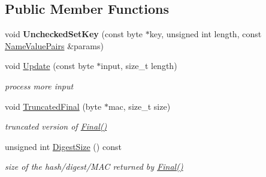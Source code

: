 \subsection*{Public Member Functions}
\begin{DoxyCompactItemize}
\item 
\hypertarget{class_d_m_a_c___base_a026cf284eb700742dc1dcb4387bd3022}{
void {\bfseries UncheckedSetKey} (const byte $\ast$key, unsigned int length, const \hyperlink{class_name_value_pairs}{NameValuePairs} \&params)}
\label{class_d_m_a_c___base_a026cf284eb700742dc1dcb4387bd3022}

\item 
\hypertarget{class_d_m_a_c___base_a2b03546cff8891451c480c18391d83a5}{
void \hyperlink{class_d_m_a_c___base_a2b03546cff8891451c480c18391d83a5}{Update} (const byte $\ast$input, size\_\-t length)}
\label{class_d_m_a_c___base_a2b03546cff8891451c480c18391d83a5}

\begin{DoxyCompactList}\small\item\em process more input \item\end{DoxyCompactList}\item 
\hypertarget{class_d_m_a_c___base_a32251a90087b43d30ea5c4698cd7ecf9}{
void \hyperlink{class_d_m_a_c___base_a32251a90087b43d30ea5c4698cd7ecf9}{TruncatedFinal} (byte $\ast$mac, size\_\-t size)}
\label{class_d_m_a_c___base_a32251a90087b43d30ea5c4698cd7ecf9}

\begin{DoxyCompactList}\small\item\em truncated version of \hyperlink{class_hash_transformation_aa0b8c7a110d8968268fd02ec32b9a8e8}{Final()} \item\end{DoxyCompactList}\item 
\hypertarget{class_d_m_a_c___base_ad17c503a5cf6e6f27f2898a0fb1e8a95}{
unsigned int \hyperlink{class_d_m_a_c___base_ad17c503a5cf6e6f27f2898a0fb1e8a95}{DigestSize} () const }
\label{class_d_m_a_c___base_ad17c503a5cf6e6f27f2898a0fb1e8a95}

\begin{DoxyCompactList}\small\item\em size of the hash/digest/MAC returned by \hyperlink{class_hash_transformation_aa0b8c7a110d8968268fd02ec32b9a8e8}{Final()} \item\end{DoxyCompactList}\end{DoxyCompactItemize}
